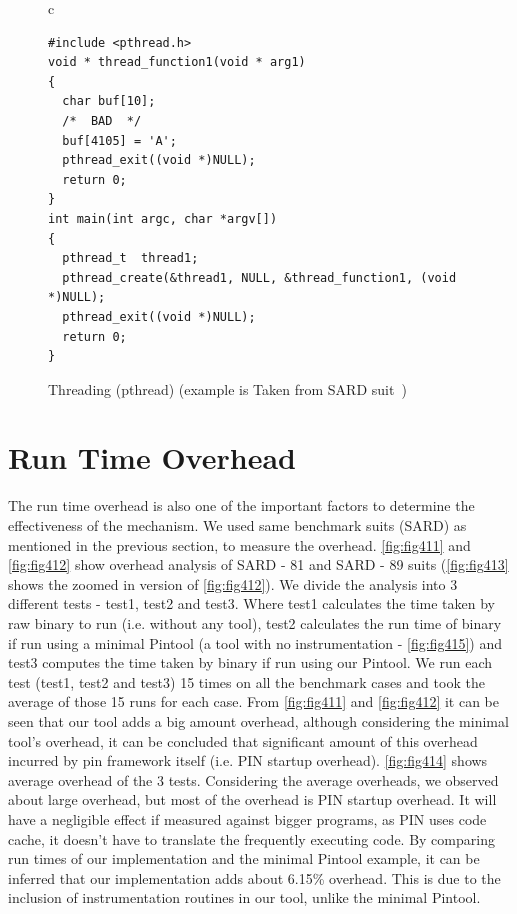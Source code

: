 \begin{figure}
\begin{centering}
\begin{tabular}{ c }
\begin{lstlisting}
#include <pthread.h>
void * thread_function1(void * arg1)
{
  char buf[10];
  /*  BAD  */
  buf[4105] = 'A';
  pthread_exit((void *)NULL);
  return 0;
}
int main(int argc, char *argv[])
{
  pthread_t  thread1;
  pthread_create(&thread1, NULL, &thread_function1, (void *)NULL);
  pthread_exit((void *)NULL);
  return 0;
}
\end{lstlisting}
\end{tabular}
\caption{Threading (pthread) (example is Taken from SARD suit~\protect\citep{sardcite})\label{fig:fig410}}
\par\end{centering}
\end{figure}

\section{Run Time Overhead}
The run time overhead is also one of the important factors to determine the effectiveness of the mechanism. We used same benchmark suits (SARD) as mentioned in the previous section, to measure the overhead. \cref{fig:fig411} and \cref{fig:fig412} show overhead analysis of SARD - 81 and SARD - 89 suits (\cref{fig:fig413} shows the zoomed in version of \cref{fig:fig412}). We divide the analysis into 3 different tests - test1, test2 and test3. Where test1 calculates the time taken by raw binary to run (i.e. without any tool), test2 calculates the run time of binary if run using a minimal Pintool (a tool with no instrumentation - \cref{fig:fig415}) and test3 computes the time taken by binary if run using our Pintool. We run each test (test1, test2 and test3) 15 times on all the benchmark cases and took the average of those 15 runs for each case. From \cref{fig:fig411} and \cref{fig:fig412} it can be seen that our tool adds a big amount overhead, although considering the minimal tool's overhead, it can be concluded that significant amount of this overhead incurred by pin framework itself (i.e. PIN startup overhead). \cref{fig:fig414} shows average overhead of the 3 tests. Considering the average overheads, we observed about large overhead, but most of the overhead is PIN startup overhead. It will have a negligible effect if measured against bigger programs, as PIN uses code cache, it doesn't have to translate the frequently executing code. By comparing run times of our implementation and the minimal Pintool example, it can be inferred that our implementation adds about 6.15\% overhead. This is due to the inclusion of instrumentation routines in our tool, unlike the minimal Pintool.

